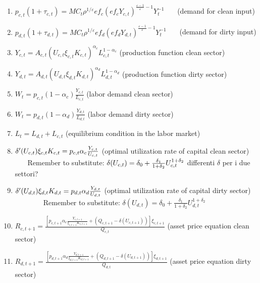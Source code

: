 \documentclass{article}
\begin{document}
\begin{enumerate}
\item $p_{c,t}\left( 1+\tau _{c,t}\right) =MC_{t}\rho ^{1/\varepsilon
}ef_{c}\left( ef_{c}Y_{c,t}\right) ^{\frac{\varepsilon -1}{\varepsilon }%
-1}Y_{t}^{-1}$ \ \ \ (demand for clean input)

\item $p_{d,t}\left( 1+\tau _{d,t}\right) =MC_{t}\rho ^{1/\varepsilon
}ef_{d}\left( ef_{d}Y_{d,t}\right) ^{\frac{\varepsilon -1}{\varepsilon }%
-1}Y_{t}^{-1}$ \ \ \ (demand for dirty input)

\item $Y_{c,t}=A_{c,t}\left( U_{c,t}\xi _{c,t}K_{c,t}\right) ^{\alpha
_{c}}L_{c,t}^{1-\alpha _{c}}$ (production function clean sector)

\item $Y_{d,t}=A_{d,t}\left( U_{d,t}\xi _{d,t}K_{d,t}\right) ^{\alpha
_{d}}L_{d,t}^{1-\alpha _{d}}$ (production function dirty sector)

\item $W_{t}=p_{c,t}\left( 1-\alpha _{c}\right) \frac{Y_{c,t}}{L_{c,t}}$
(labor demand clean sector)

\item $W_{t}=p_{d,t}\left( 1-\alpha _{d}\right) \frac{Y_{d,t}}{L_{d,t}}$
(labor demand dirty sector)

\item $L_{t}=L_{d,t}+L_{c,t}$ (equilibrium condition in the labor market)

\item $\delta ^{\prime }(U_{c,t})\xi _{c,t}K_{c,t}=p_{c,t}\alpha _{c}\frac{%
Y_{c,t}}{U_{c,t}}$ (optimal utilization rate of capital clean sector) $\ \ \
\ \ \ \ \ $Remember to substitute: $\delta (U_{c,t})=\delta _{0}+\frac{%
\delta _{1}}{1+\delta _{2}}U_{c,t}^{1+\delta _{2}}$ differenti $\delta $ per
i due settori?

\item $\delta ^{\prime }(U_{d,t})\xi _{d,t}K_{d,t}=p_{d,t}\alpha _{d}\frac{%
Y_{d,t}}{U_{d,t}}$ (optimal utilization rate of capital dirty sector) \ \ \
\ \ \ \ \ Remember to substitute: $\delta (U_{d,t})=\delta _{0}+\frac{\delta
_{1}}{1+\delta _{2}}U_{d,t}^{1+\delta _{2}}$

\item $R_{c,t+1}=\frac{\left[ p_{c,t+1}\alpha _{c}\frac{Y_{c,t+1}}{\xi
_{c,t+1}K_{c,t+1}}+\left( Q_{c,t+1}-\delta (U_{c,t+1})\right) \right] \xi
_{c,t+1}}{Q_{c,t}}$ (asset price equation clean sector)

\item $R_{d,t+1}=\frac{\left[ p_{d,t+1}\alpha _{d}\frac{Y_{d,t+1}}{\xi
_{d,t+1}K_{d,t+1}}+\left( Q_{d,t+1}-\delta (U_{d,t+1})\right) \right] \xi
_{d,t+1}}{Q_{d,t}}$ (asset price equation dirty sector)


\end{enumerate}
\end{document}
